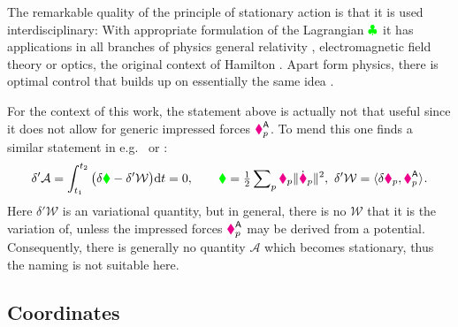 
The remarkable quality of the principle of stationary action is that it is used interdisciplinary:
With appropriate formulation of the Lagrangian $\textcolor{green}{\clubsuit}$ it has applications in all branches of physics \eg general relativity \cite{Einstein:HamiltonsPrinciple}, electromagnetic field theory \cite[ch.\,4]{Landau:Fields} or optics, the original context of Hamilton \cite[p.\,192]{Klein:EntwicklungDerMathematik}.
Apart form physics, there is optimal control that builds up on essentially the same idea \eg \cite{Bryson:AppliedOptimalControl}.


For the context of this work, the statement above is actually not that useful since it does not allow for generic impressed forces $\boldsymbol{\textcolor{magenta}{\blacklozenge}}_{p}^{\mathsf{A}}$.
To mend this one finds a similar statement in e.g.\ \cite[eq.\,12.2.14]{Lurie:AnalyticalMechanics} or \cite[sec.\ I.3]{Szabo:HM}:
\begin{align}\label{eq:HamiltonPrinciple}
 \delta'\mathcal{A} = \int_{t_1}^{t_2} \big( \delta \textcolor{green}{\blacklozenge} - \delta'\mathcal{W} \big) \mathrm{d} t = 0, 
\qquad
 \textcolor{green}{\blacklozenge} = \tfrac{1}{2} \sum\nolimits_{p} \textcolor{magenta}{\blacklozenge}_{p} \| \dot{\boldsymbol{\textcolor{magenta}{\blacklozenge}}}_{p} \|_{}^2, \ \delta'\mathcal{W} = \langle \delta \boldsymbol{\textcolor{magenta}{\blacklozenge}}_{p}, \boldsymbol{\textcolor{magenta}{\blacklozenge}}_{p}^{\mathsf{A}} \rangle_{}.
\end{align}
Here $\delta'\mathcal{W}$ is an variational quantity, but in general, there is no $\mathcal{W}$ that it is the variation of, unless the impressed forces $\boldsymbol{\textcolor{magenta}{\blacklozenge}}_{p}^{\mathsf{A}}$ may be derived from a potential.
Consequently, there is generally no quantity $\mathcal{A}$ which becomes stationary, thus the naming is not suitable here.

\subsection{Coordinates}
